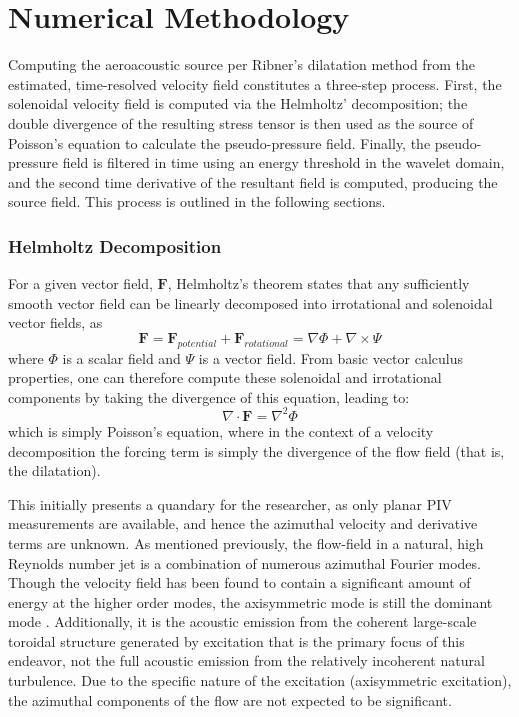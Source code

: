 \section{Numerical Methodology}
Computing the aeroacoustic source per Ribner's dilatation method from the estimated, time-resolved velocity field constitutes a three-step process. 
First, the solenoidal velocity field is computed via the Helmholtz' decomposition; the double divergence of the resulting stress tensor is then used as the source of Poisson's equation to calculate the pseudo-pressure field. 
Finally, the pseudo-pressure field is filtered in time using an energy threshold in the wavelet domain, and the second time derivative of the resultant field is computed, producing the source field.
This process is outlined in the following sections.
\subsubsection{Helmholtz Decomposition}
For a given vector field, $\mathbf{F}$, Helmholtz's theorem states that any sufficiently smooth vector field can be linearly decomposed into irrotational and solenoidal vector fields, as
\begin{equation}
\mathbf{F} = \mathbf{F}_{potential} + \mathbf{F}_{rotational} = \nabla \Phi + \nabla \times \Psi
\end{equation}
where $\Phi$ is a scalar field and $\Psi$ is a vector field.
From basic vector calculus properties, one can therefore compute these solenoidal and irrotational components by taking the divergence of this equation, leading to:
\begin{equation}
\nabla \cdot \mathbf{F} = \nabla^{2} \Phi
\end{equation}
which is simply Poisson's equation, where in the context of a velocity decomposition the forcing term is simply the divergence of the flow field (that is, the dilatation).

This initially presents a quandary for the researcher, as only planar PIV measurements are available, and hence the azimuthal velocity and derivative terms are unknown.
As mentioned previously, the flow-field in a natural, high Reynolds number jet is a combination of numerous azimuthal Fourier modes.
Though the velocity field has been found to contain a significant amount of energy at the higher order modes, the axisymmetric mode is still the dominant mode \citep{Glauser1987}.
Additionally, it is the acoustic emission from the coherent large-scale toroidal structure generated by excitation that is the primary focus of this endeavor, not the full acoustic emission from the relatively incoherent natural turbulence.
Due to the specific nature of the excitation (axisymmetric excitation), the azimuthal components of the flow are not expected to be significant.

